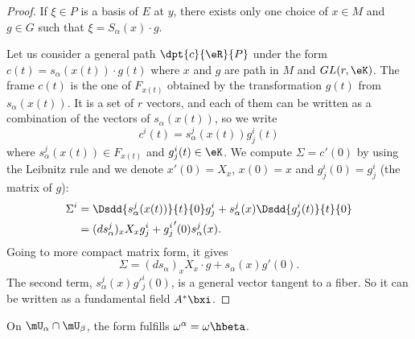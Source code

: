 \begin{proof}
	If $\xi\in P$ is a basis of $E$ at $y$, there exists only one choice of $x\in M$ and $g\in G$ such that $\xi=S_{\alpha}(x)\cdot g$.

	Let us consider a general path $\dpt{c}{\eR}{P}$ under the form $c(t)=s_{\alpha}(x(t))\cdot g(t)$ where $x$ and $g$ are path in $M$ and $GL(r,\eK)$. The frame $c(t)$ is the one of $F_{x(t)}$ obtained by the transformation $g(t)$ from $s_{\alpha}(x(t))$. It is a set of $r$ vectors, and each of them can be written as a combination of the vectors of $s_{\alpha}(x(t))$, so we write
	\begin{equation}
		c^i(t)=s_{\alpha}^j(x(t))g_j^i(t)
	\end{equation}
	where $s_{\alpha}^j(x(t))\in F_{x(t)}$ and $g_j^i(t)\in\eK$. We compute $\Sigma=c'(0)$ by using the Leibnitz rule and we denote $x'(0)=X_x$, $x(0)=x$ and $g^i_j(0)=g^i_j$ (the matrix of $g$):
	\begin{equation}
		\begin{split}
			\Sigma^i&=\Dsdd{  s^j_{\alpha}(x(t))  }{t}{0}g^i_j+s^j_{\alpha}(x)\Dsdd{g^i_j(t)}{t}{0}\\
			&=(ds_{\alpha}^j)_xX_xg^i_j+{g^i_j}'(0)s^j_{\alpha}(x).
		\end{split}
	\end{equation}
	Going to more compact matrix form, it gives
	\[
		\Sigma=(ds_{\alpha})_xX_x\cdot g+s_{\alpha}(x)g'(0).
	\]
	The second term, $s_{\alpha}^j(x)g'^i_j(0)$, is a general vector tangent to a fiber. So it can be written as a fundamental field $A^*\bxi$.

\end{proof}

\begin{lemma}
	On $\mU_{\alpha}\cap\mU_{\beta}$, the form fulfills $\omega^{\alpha}=\omega\hbeta$.
\end{lemma}

